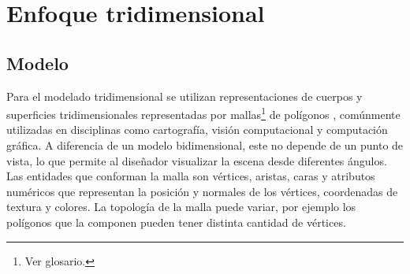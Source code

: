 \section{Enfoque tridimensional}
\subsection{Modelo}
Para el modelado tridimensional se utilizan representaciones de cuerpos y superficies tridimensionales representadas por mallas\footnote{Ver glosario.} de polígonos \cite{Mesh_building}, comúnmente utilizadas en disciplinas como cartografía, visión computacional y computación gráfica. A diferencia de un modelo bidimensional, este no depende de un punto de vista, lo que permite al diseñador visualizar la escena desde diferentes ángulos. Las entidades que conforman la malla son vértices, aristas, caras y atributos numéricos que representan la posición y normales de los vértices, coordenadas de textura y colores. La topología de la malla puede variar, por ejemplo los polígonos que la componen pueden tener distinta cantidad de vértices.

